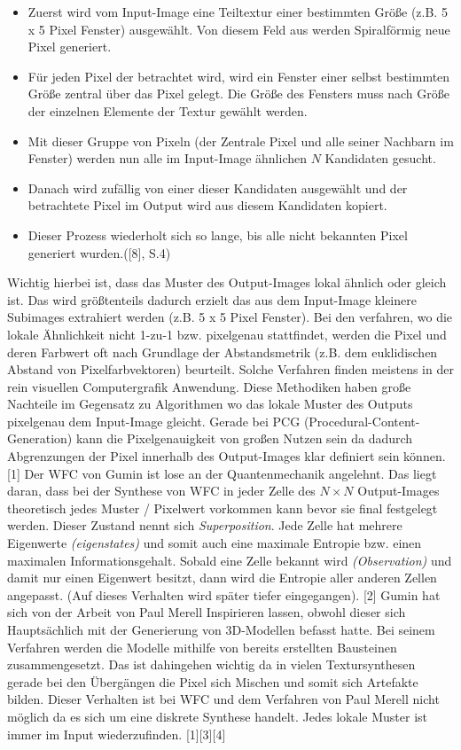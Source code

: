 \documentclass[12pt]{report}
\begin{document}
\begin{itemize}
    \item Zuerst wird vom Input-Image eine Teiltextur einer bestimmten Größe {(z.B. 5 x 5 Pixel Fenster)} ausgewählt. Von diesem Feld aus werden Spiralförmig neue Pixel generiert.
    \item Für jeden Pixel der betrachtet wird, wird ein Fenster einer selbst bestimmten Größe zentral über das Pixel gelegt.
    Die Größe des Fensters muss nach Größe der einzelnen Elemente der Textur gewählt werden.
    \item Mit dieser Gruppe von Pixeln {(der Zentrale Pixel und alle seiner Nachbarn im Fenster)} werden nun alle im Input-Image ähnlichen $N$ Kandidaten gesucht.
    \item Danach wird zufällig von einer dieser Kandidaten ausgewählt und der betrachtete Pixel im Output wird aus diesem Kandidaten kopiert.
    \item Dieser Prozess wiederholt sich so lange, bis alle nicht bekannten Pixel generiert wurden.{([8], S.4)}
\end{itemize}




\noindent Wichtig hierbei ist, dass das Muster des Output-Images lokal ähnlich oder gleich ist.
Das wird größtenteils dadurch erzielt das aus dem Input-Image kleinere Subimages extrahiert werden {(z.B. 5 x 5 Pixel Fenster)}.
Bei den verfahren, wo die lokale Ähnlichkeit nicht 1-zu-1 bzw. pixelgenau stattfindet, werden die Pixel und deren Farbwert oft nach Grundlage der Abstandsmetrik {(z.B. dem euklidischen Abstand von Pixelfarbvektoren)} beurteilt.
Solche Verfahren finden meistens in der rein visuellen Computergrafik Anwendung.
Diese Methodiken haben große Nachteile im Gegensatz zu Algorithmen wo das lokale Muster des Outputs pixelgenau dem Input-Image gleicht.
Gerade bei PCG {(Procedural-Content-Generation)} kann die Pixelgenauigkeit von großen Nutzen sein da dadurch Abgrenzungen der Pixel innerhalb des Output-Images klar definiert sein können.
{[1]}
Der WFC von Gumin ist lose an der Quantenmechanik angelehnt.
Das liegt daran, dass bei der Synthese von WFC in jeder Zelle des $N\times N$ Output-Images theoretisch jedes Muster / Pixelwert vorkommen kann bevor sie final festgelegt werden.
Dieser Zustand nennt sich \textit{Superposition}.
Jede Zelle hat mehrere Eigenwerte \textit{(eigenstates)} und somit auch eine maximale Entropie bzw. einen maximalen Informationsgehalt.
Sobald eine Zelle bekannt wird \textit{(Observation)} und damit nur einen Eigenwert besitzt, dann wird die Entropie aller anderen Zellen angepasst.
{(Auf dieses Verhalten wird später tiefer eingegangen)}. {[2]}
Gumin hat sich von der Arbeit von Paul Merell Inspirieren lassen, obwohl dieser sich Hauptsächlich mit der Generierung von 3D-Modellen befasst hatte.
Bei seinem Verfahren werden die Modelle mithilfe von bereits erstellten Bausteinen zusammengesetzt.
Das ist dahingehen wichtig da in vielen Textursynthesen gerade bei den Übergängen die Pixel sich Mischen und somit sich Artefakte bilden.
Dieser Verhalten ist bei WFC und dem Verfahren von Paul Merell nicht möglich da es sich um eine diskrete Synthese handelt.
Jedes lokale Muster ist immer im Input wiederzufinden. {[1]}{[3]}{[4]}
\end{document}

